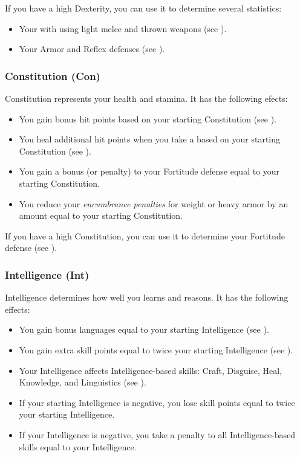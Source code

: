             If you have a high Dexterity, you can use it to determine several statistics:
            \begin{itemize}
                \item Your  with  using light melee and thrown weapons (see ).
                \item Your Armor and Reflex defenses (see ).
            \end{itemize}

        \subsubsection{Constitution (Con)}\label{Constitution}
            Constitution represents your health and stamina.
            It has the following efects:
            \begin{itemize}
                \item You gain bonus hit points based on your starting Constitution (see ).
                \item You heal additional hit points when you take a  based on your starting Constitution (see ).
                \item You gain a bonus (or penalty) to your Fortitude defense equal to your starting Constitution.
                \item You reduce your \textit{encumbrance penalties} for weight or heavy armor by an amount equal to your starting Constitution.
            \end{itemize}

            If you have a high Constitution, you can use it to determine your Fortitude defense (see ).

        \subsubsection{Intelligence (Int)}\label{Intelligence}
            Intelligence determines how well you learns and reasons.
            It has the following effects:

            \begin{itemize}
                \item You gain bonus languages equal to your starting Intelligence (see ).
                \item You gain extra skill points equal to twice your starting Intelligence (see ).
                \item Your Intelligence affects Intelligence-based skills: Craft, Disguise, Heal, Knowledge, and Linguistics (see ).
                \item If your starting Intelligence is negative, you lose skill points equal to twice your starting Intelligence.
                \item If your Intelligence is negative, you take a penalty to all Intelligence-based skills equal to your Intelligence.
            \end{itemize}

